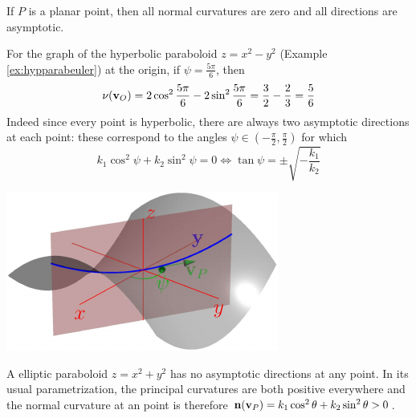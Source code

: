 \begin{examples}{}{}
	\exstart If $P$ is a planar point, then all normal curvatures are zero and all directions are asymptotic.
	\begin{enumerate}\setcounter{enumi}{1}
		\begin{minipage}[t]{0.6\linewidth}\vspace{0pt}
	  	\item For the graph of the hyperbolic paraboloid $z=x^2-y^2$ (Example \ref{ex:hypparabeuler}) at the origin, if $\psi=\frac{5\pi}6$, then
			\[
				\nu(\vv_O) =2\cos^2\frac{5\pi}6-2\sin^2\frac{5\pi}6 =\frac 32-\frac 23 =\frac 56 %
			\]
			Indeed since every point is hyperbolic, there are always two asymptotic directions at each point: these correspond to the angles $\psi\in(-\frac\pi 2,\frac\pi 2)$ for which 
			\[
				k_1\cos^2\psi+k_2\sin^2\psi=0\iff \tan\psi=\pm\sqrt{-\frac{k_1}{k_2}}
			\]
		\end{minipage}
		\hfill
		\begin{minipage}[t]{0.39\linewidth}\vspace{0pt}
	  	\flushright\href{http://www.math.uci.edu/~ndonalds/math162a/euler-setup2.html}{\includegraphics{euler-setup2}}
		\end{minipage}
		\par

  	\item A elliptic paraboloid $z=x^2+y^2$ has no asymptotic directions at any point. In its usual parametrization, the principal curvatures are both positive everywhere and  the normal curvature at an point is therefore ${\mathbf{n}}({\mathbf{v}}_P)=k_1\cos^2\theta+k_2\sin^2\theta>0$.

	\end{enumerate}
\end{examples}

